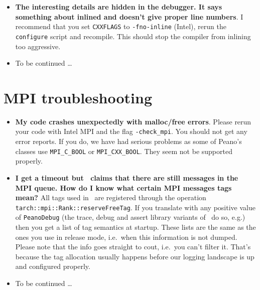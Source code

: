\begin{itemize}
{    recognized''}. automake puts the actual executable into a \texttt{.libs}
    directory and creates bash scripts invoking those guys. Change into
    \texttt{.libs} and run gdb directly on the executable. Before you do so,
    ensure that \texttt{LD\_LIBRARY\_Path} points to the directory containing
    the libraries. Again, those guys are stored in a \texttt{.libs}
    subdirectory, so the library path should point to that subdirectory. 
  \item \textbf{The interesting details are hidden in the debugger. It says
    something about inlined and doesn't give proper line numbers}.
    I recommend that you set \texttt{CXXFLAGS} to \texttt{-fno-inline} (Intel),
    rerun the \texttt{configure} script and recompile. This should stop the
    compiler from inlining too aggressive.
  \item To be continued \dots
\end{itemize}
 
 
 
 



\section{MPI troubleshooting}
\begin{itemize}
  \item \textbf{My code crashes unexpectedly with malloc/free errors}. Please
  rerun your code with Intel MPI and the flag \texttt{-check\_mpi}. You should
  not get any error reports. If you do, we have had serious problems as some of
  Peano's classes use \texttt{MPI\_C\_BOOL} or \texttt{MPI\_CXX\_BOOL}. They
  seem not be supported properly.
  \item \textbf{I get a timeout but \Peano\ claims that there are still
  messages in the MPI queue. How do I know what certain MPI messages tags
  mean?} All tags used in \Peano\ are registered through the operation 
  \texttt{tarch::mpi::Rank::reserveFreeTag}. If you translate with any positive
  value of \texttt{PeanoDebug} (the trace, debug and assert library variants of
  \Peano\ do so, e.g.) then you get a list of tag semantics at startup. These
  lists are the same as the ones you use in release mode, i.e.~when this
  information is not dumped. Please note that the info goes straight to cout,
  i.e.~you can't filter it. That's because the tag allocation usually happens
  before our logging landscape is up and configured properly.
  \item To be continued \dots
\end{itemize}



